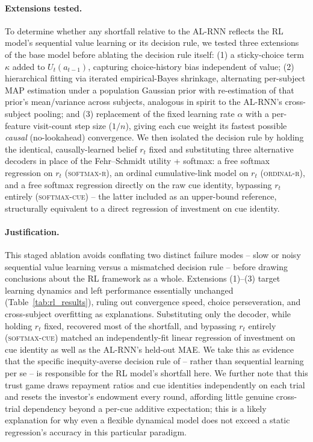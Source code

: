 \documentclass[11pt]{article}
\begin{document}
\paragraph{Extensions tested.}
To determine whether any shortfall relative to the AL-RNN reflects the RL
model's sequential value learning or its decision rule, we tested three
extensions of the base model before ablating the decision rule itself: (1) a
sticky-choice term $\kappa$ added to $U_t(a_{t-1})$, capturing
choice-history bias independent of value; (2) hierarchical fitting via
iterated empirical-Bayes shrinkage, alternating per-subject MAP estimation
under a population Gaussian prior with re-estimation of that prior's
mean/variance across subjects, analogous in spirit to the AL-RNN's
cross-subject pooling; and (3) replacement of the fixed learning rate
$\alpha$ with a per-feature visit-count step size ($1/n$), giving each cue
weight its fastest possible \emph{causal} (no-lookahead) convergence. We
then isolated the decision rule by holding the identical, causally-learned
belief $r_t$ fixed and substituting three alternative decoders in place of
the Fehr--Schmidt utility + softmax: a free softmax regression on $r_t$
(\textsc{softmax-r}), an ordinal cumulative-link model on $r_t$
(\textsc{ordinal-r}), and a free softmax regression directly on the raw cue
identity, bypassing $r_t$ entirely (\textsc{softmax-cue}) -- the latter
included as an upper-bound reference, structurally equivalent to a direct
regression of investment on cue identity.

\paragraph{Justification.}
This staged ablation avoids conflating two distinct failure modes -- slow or
noisy sequential value learning versus a mismatched decision rule -- before
drawing conclusions about the RL framework as a whole. Extensions (1)--(3)
target learning dynamics and left performance essentially unchanged
(Table~\ref{tab:rl_results}), ruling out convergence speed, choice
perseveration, and cross-subject overfitting as explanations. Substituting
only the decoder, while holding $r_t$ fixed, recovered most of the
shortfall, and bypassing $r_t$ entirely (\textsc{softmax-cue}) matched an
independently-fit linear regression of investment on cue identity as well
as the AL-RNN's held-out MAE. We take this as evidence that the specific
inequity-averse decision rule of \citet{FehrSchmidt1999} -- rather than
sequential learning per se -- is responsible for the RL model's shortfall
here. We further note that this trust game draws repayment ratios and cue
identities independently on each trial and resets the investor's endowment
every round, affording little genuine cross-trial dependency beyond a
per-cue additive expectation; this is a likely explanation for why even a
flexible dynamical model does not exceed a static regression's accuracy in
this particular paradigm.
\end{document}
